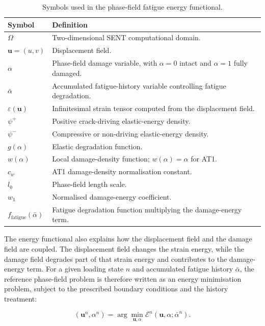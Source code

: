 \begingroup
\begin{longtable}{p{} p{}}
\caption{Symbols used in the phase-field fatigue energy functional.}
\label{tab:c3_energy_symbols}\\
\hline
\textbf{Symbol} & \textbf{Definition} \\
\hline
\(\Omega\) & Two-dimensional SENT computational domain. \\
\(\mathbf{u}=(u,v)\) & Displacement field. \\
\(\alpha\) & Phase-field damage variable, with \(\alpha=0\) intact and \(\alpha=1\) fully damaged. \\
\(\bar{\alpha}\) & Accumulated fatigue-history variable controlling fatigue degradation. \\
\(\varepsilon(\mathbf{u})\) & Infinitesimal strain tensor computed from the displacement field. \\
\(\psi^+\) & Positive crack-driving elastic-energy density. \\
\(\psi^-\) & Compressive or non-driving elastic-energy density. \\
\(g(\alpha)\) & Elastic degradation function. \\
\(w(\alpha)\) & Local damage-density function; \(w(\alpha)=\alpha\) for AT1. \\
\(c_w\) & AT1 damage-density normalisation constant. \\
\(l_0\) & Phase-field length scale. \\
\(w_1\) & Normalised damage-energy coefficient. \\
\(f_{\mathrm{fatigue}}(\bar{\alpha})\) & Fatigue degradation function multiplying the damage-energy term. \\
\hline
\end{longtable}
\endgroup


The energy functional also explains how the displacement field and the damage field are coupled. The displacement field changes the strain energy, while the damage field degrades part of that strain energy and contributes to the damage-energy term. For a given loading state $n$ and accumulated fatigue history $\bar{\alpha}$, the reference phase-field problem is therefore written as an energy minimisation problem, subject to the prescribed boundary conditions and the history treatment:

\begin{equation}
    (\mathbf{u}^{n},\alpha^{n})
    =
    \arg\min_{\mathbf{u},\alpha}
    \mathcal{E}^{n}
    \left(
    \mathbf{u},\alpha;
    \bar{\alpha}^{n}
    \right).
    \label{eq:c3_fatigue_phase_field_problem}
\end{equation}



